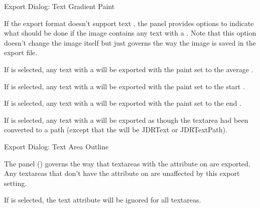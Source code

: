 
 {}
 {Export Dialog: Text Gradient Paint}

If the export format doesn't support text , the
 panel provides options to indicate
what should be done if the image contains any text with a 
. Note that this option doesn't change
the image itself but just governs the way the image is saved in the export
file.


If  is selected, any text
with a  will be exported with the paint set to
the average .


If  is selected, any text
with a  will be exported with the paint set to
the start .


If  is selected, any text
with a  will be exported with the paint set to
the end .


If  is selected, any text
with a  will be exported as though the
\gls{textarea} had been converted to a path (except that the 
 will be \gls{JDRText} or \gls{JDRTextPath}).


 {}
 {Export Dialog: Text Area Outline}

The  panel
() governs the way that
\glspl{textarea} with the  attribute on are
exported.  Any \glspl{textarea} that don't have the
 attribute on are unaffected by this export
setting.


If  is selected, the
 text attribute will be ignored for all
\glspl{textarea}.

